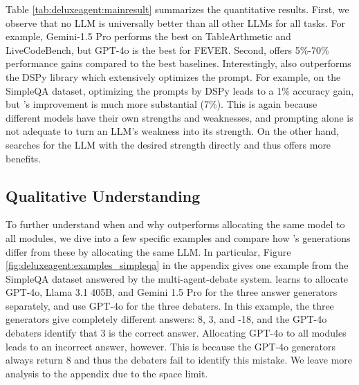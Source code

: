 Table \ref{tab:deluxeagent:mainresult} summarizes the quantitative results. First, we observe that no LLM is universally better than all other LLMs for all tasks. For example, Gemini-1.5 Pro performs the best on TableArthmetic and LiveCodeBench, but GPT-4o is the best for FEVER. %
Second, \deluxesystem{} offers 5\%-70\% performance gains compared to the best baselines. Interestingly, \deluxesystem{} also outperforms the DSPy library which extensively optimizes the prompt. For example, on the SimpleQA dataset, optimizing the prompts by DSPy leads to a 1\% accuracy gain, but \deluxesystem{}'s improvement is much more substantial (7\%). 
This is again because different models have their own strengths and weaknesses, and prompting alone is not adequate to turn an LLM's weakness into its strength. On the other hand, \deluxesystem{} searches for the LLM with the desired strength directly and thus offers more benefits.  

\subsection{Qualitative Understanding}






To further understand when and why  \deluxesystem{} outperforms allocating the same model to all modules, we dive into a few specific examples and compare how \deluxesystem{}'s generations differ from these by allocating the same LLM. In particular,  Figure \ref{fig:deluxeagent:examples_simpleqa} in the appendix gives one example from the SimpleQA dataset answered by the multi-agent-debate system. \deluxesystem{} learns to allocate GPT-4o, Llama 3.1 405B, and Gemini 1.5 Pro for the three answer generators separately, and use GPT-4o for the three debaters. In this example, the three generators give completely different answers: 8, 3, and -18, and the GPT-4o debaters identify that 3 is the correct answer.
Allocating GPT-4o to all modules leads to an incorrect answer, however. This is because the GPT-4o generators always return 8 and thus the debaters fail to identify this mistake. We leave more analysis to the appendix due to the space limit. 






